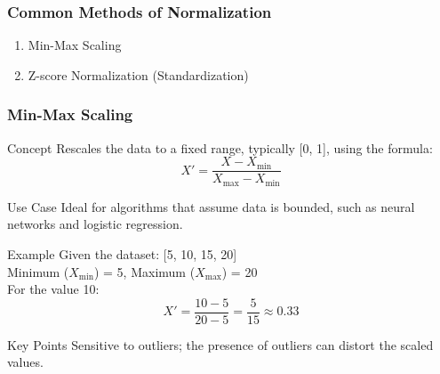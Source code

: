 \documentclass[aspectratio=169]{beamer}
\begin{document}
\begin{frame}[fragile]
    \frametitle{Common Methods of Normalization}
    \begin{enumerate}
        \item Min-Max Scaling
        \item Z-score Normalization (Standardization)
    \end{enumerate}
\end{frame}

\begin{frame}[fragile]
    \frametitle{Min-Max Scaling}
    \begin{block}{Concept}
        Rescales the data to a fixed range, typically [0, 1], using the formula:
        \begin{equation}
            X' = \frac{X - X_{\min}}{X_{\max} - X_{\min}}
        \end{equation}
    \end{block}
    
    \begin{block}{Use Case}
        Ideal for algorithms that assume data is bounded, such as neural networks and logistic regression.
    \end{block}
    
    \begin{block}{Example}
        Given the dataset: [5, 10, 15, 20] \\
        Minimum ($X_{\min}$) = 5, Maximum ($X_{\max}$) = 20 \\
        For the value 10:
        \begin{equation}
            X' = \frac{10 - 5}{20 - 5} = \frac{5}{15} \approx 0.33
        \end{equation}
    \end{block}
    
    \begin{block}{Key Points}
        Sensitive to outliers; the presence of outliers can distort the scaled values.
    \end{block}
\end{frame}
\end{document}
